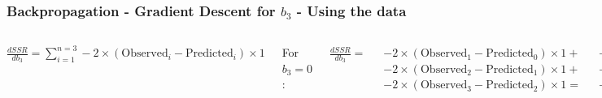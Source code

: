 \documentclass[aspectratio=169]{beamer}
\begin{document}
\begin{frame}[fragile]\frametitle{Backpropagation - Gradient Descent for $b_3$ - Using the data}
\begin{columns}
    $\displaystyle \frac{d SSR}{d b_3} =   \sum_{i=1}^{n=3} -2 \times (\mathrm{Observed}_i - \mathrm{Predicted}_i)\times 1$

    \vspace{3mm}
 
    For $b_3=0$:
    
    \vspace{3mm}
    
    $\displaystyle \frac{d SSR}{d b_3} = $
    
    $-2 \times (\mathrm{Observed}_1 - \mathrm{Predicted}_0)\times 1 +$
    $-2 \times (\mathrm{Observed}_2 - \mathrm{Predicted}_1)\times 1 +$
    $-2 \times (\mathrm{Observed}_3 - \mathrm{Predicted}_2)\times 1 =$
\pause
    \vspace{3mm}

    $-2 \times (0 - -2.6)\times 1 +$
    $-2 \times (1 - -1.6)\times 1 +$
    $-2 \times (0 - -2.61)\times 1 = -15.7$
\pause
    \vspace{3mm}

    $\mathrm{Step Size} = 0.1 \times -15.7 = -1.57$ (Learning Rate = 0.1)
    $\mathrm{New } b_3 = b_3 - \mathrm{Step Size} = 1.57$
    

\end{columns}
\end{frame}
\end{document}
